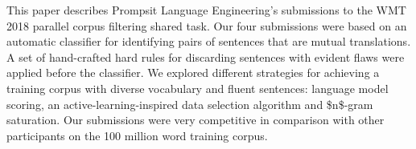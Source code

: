 This paper describes Prompsit Language Engineering's submissions to the WMT 2018 parallel corpus filtering shared task. Our four submissions were based on an automatic classifier for identifying pairs of sentences that are mutual translations. A set of hand-crafted hard rules for discarding sentences with evident flaws were applied before the classifier. We explored different strategies for achieving a training corpus with diverse vocabulary and fluent sentences: language model scoring, an active-learning-inspired data selection algorithm and \$n\$-gram saturation. Our submissions were very competitive in comparison with other participants on the 100 million word training corpus.
